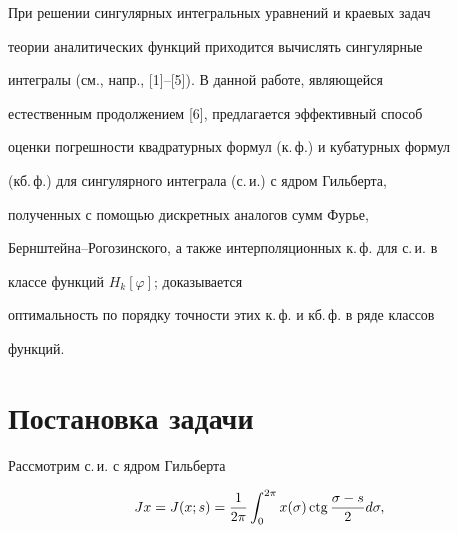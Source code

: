 \date{}




\pagestyle{plain} %







\maketitle


\label{begin}











При решении сингулярных интегральных уравнений и краевых задач


теории аналитических функций приходится вычислять сингулярные


интегралы (см., напр., [1]--[5]). В данной работе, являющейся


естественным продолжением [6], предлагается эффективный способ


оценки погрешности квадратурных формул (к.\,ф.) и кубатурных формул


(кб.\,ф.) для сингулярного интеграла (с.\,и.) с ядром Гильберта,


полученных с помощью дискретных аналогов сумм Фурье,


Бернштейна--Рогозинского, а также интерполяционных к.\,ф. для с.\,и. в


классе функций $H_k[\varphi]$; доказывается


оптимальность по порядку точности этих к.\,ф. и кб.\,ф. в ряде классов


функций.








\section{Постановка задачи}








Рассмотрим с.\,и. с ядром Гильберта


\begin{equation}\label{eq1}


Jx=J(x;s)=\frac1{2\pi}\int_0^{2\pi}x


(\sigma)\ctg\frac{\sigma-s}{2}d\sigma,


\end{equation}


